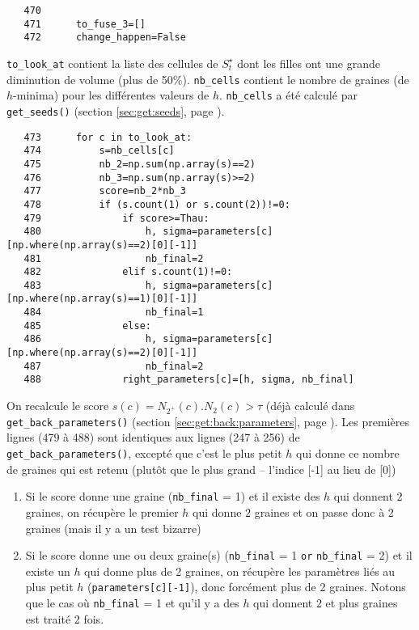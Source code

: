 \documentclass{article}
\def \mycolor {red}
\begin{document}
\color{black}
\begin{verbatim} 
   470	                
   471	    to_fuse_3=[]
   472	    change_happen=False
\end{verbatim} 
\color{\mycolor}
\verb|to_look_at| contient la liste des cellules de $S^{\star}_t$ dont les filles ont une grande diminution de volume (plus de 50\%).
\verb|nb_cells| contient le nombre de graines (de $h$-minima) pour les diff\'erentes valeurs de $h$. \verb|nb_cells| a \'et\'e calcul\'e par \texttt{get\_seeds()} (section \ref{sec:get:seeds}, page \pageref{sec:get:seeds}).
\color{black}
\begin{verbatim} 
   473	    for c in to_look_at:
   474	        s=nb_cells[c]
   475	        nb_2=np.sum(np.array(s)==2)
   476	        nb_3=np.sum(np.array(s)>=2)
   477	        score=nb_2*nb_3
   478	        if (s.count(1) or s.count(2))!=0:
   479	            if score>=Thau:
   480	                h, sigma=parameters[c][np.where(np.array(s)==2)[0][-1]]
   481	                nb_final=2
   482	            elif s.count(1)!=0:
   483	                h, sigma=parameters[c][np.where(np.array(s)==1)[0][-1]]
   484	                nb_final=1
   485	            else:
   486	                h, sigma=parameters[c][np.where(np.array(s)==2)[0][-1]]
   487	                nb_final=2
   488	            right_parameters[c]=[h, sigma, nb_final]
\end{verbatim} 
\color{\mycolor}
On recalcule le score $s(c) = N_{2^{+}}(c) . N_{2}(c) > \tau$ (d\'ej\`a calcul\'e dans \texttt{get\_back\_parameters()} (section \ref{sec:get:back:parameters}, page \pageref{sec:get:back:parameters}).
Les premi\`eres lignes (479 \`a 488) sont identiques aux lignes (247 \`a 256) de \texttt{get\_back\_parameters()}, except\'e que c'est le plus petit $h$ qui donne ce nombre de graines qui est retenu (plut\^ot que le plus grand -- l'indice [-1] au lieu de [0])
\begin{enumerate}
\itemsep -0.5ex
\item Si le score donne une graine (\verb|nb_final| = 1) et il existe des $h$ qui donnent 2 graines,  on r\'ecup\`ere le premier $h$ qui donne $2$ graines   et on passe donc \`a 2 graines (mais il y a un test bizarre)

\item Si le score donne une ou deux graine(s) (\verb|nb_final| = 1 \verb|or| \verb|nb_final| = 2) et il existe un $h$ qui donne plus de  2 graines, on r\'ecup\`ere les param\`etres li\'es au plus petit $h$ (\verb|parameters[c][-1]|), donc forc\'ement plus de 2 graines. 
Notons que le cas o\`u \verb|nb_final| = 1 et qu'il y a des $h$ qui donnent 2 et plus graines est trait\'e 2 fois.

\end{enumerate}
\end{document}
